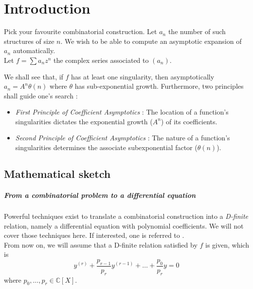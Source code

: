 \documentclass[../main.tex]{subfiles}
\begin{document}
\chapter{Introduction}


Pick your favourite combinatorial construction. Let $a_n$ the number of such structures of size $n$. We wish to be able to compute an asymptotic expansion of $a_n$ automatically.\\

Let $f = \sum a_n z^n$ the complex series associated to $(a_n)$.

We shall see that, if $f$ has at least one singularity, then asymptotically $a_n = A^n \theta(n)$ where $\theta$ has sub-exponential growth.
Furthermore, two principles shall guide one's search :

\begin{itemize}
	\item	\emph{First Principle of Coefficient Asymptotics} : The location of a function’s
			singularities dictates the exponential growth ($A^n$) of its coefficients.
	
	\item	\emph{Second Principle of Coefficient Asymptotics} : The nature of a function’s
			singularities determines the associate subexponential factor ($\theta(n)$).
	
\end{itemize}

\section{Mathematical sketch}

\paragraph{From a combinatorial problem to a differential equation}
Powerful techniques exist to translate a combinatorial construction into a \emph{D-finite} relation, namely a differential equation with polynomial coefficients.
We will not cover those techniques here. If interested, one is referred to \cite{Flajolet2009}.\\

From now on, we will assume that a D-finite relation satisfied by $f$ is given, which is 
\begin{equation}\label{basic_eq_diff}
y^{(r)} + \frac{p_{r-1}}{p_r} y^{(r - 1)} + \dots + \frac{p_0}{p_r} y = 0
\end{equation}
where $p_0, \dots, p_r \in \mathbb{C}[X]$.
\end{document}
